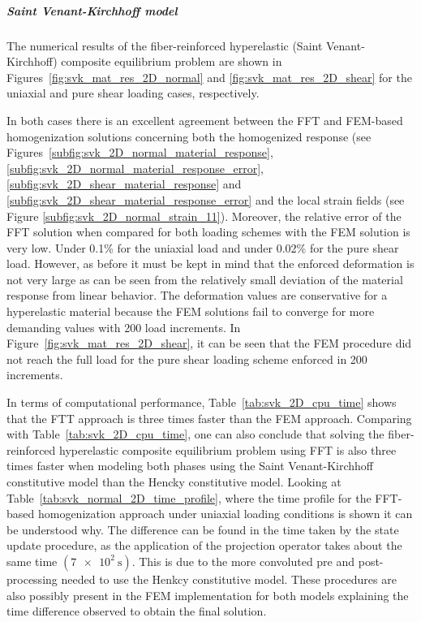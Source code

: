 
%

\FloatBarrier

\subparagraph{Saint Venant-Kirchhoff model}
\label{sec:svk_accuracy_validation}

The numerical results of the fiber-reinforced hyperelastic (Saint Venant-Kirchhoff) composite equilibrium problem are shown in Figures~\ref{fig:svk_mat_res_2D_normal} and \ref{fig:svk_mat_res_2D_shear} for the uniaxial and pure shear loading cases, respectively.

In both cases there is an excellent agreement between the FFT and FEM-based homogenization solutions concerning both the homogenized response (see Figures~\ref{subfig:svk_2D_normal_material_response}, \ref{subfig:svk_2D_normal_material_response_error}, \ref{subfig:svk_2D_shear_material_response} and \ref{subfig:svk_2D_shear_material_response_error} and the local strain fields (see Figure \ref{subfig:svk_2D_normal_strain_11}).
Moreover, the relative error of the FFT solution when compared for both loading schemes with the FEM solution is very low.
Under 0.1\% for the uniaxial load and under 0.02\% for the pure shear load.
However, as before it must be kept in mind that the enforced deformation is not very large as can be seen from the relatively small deviation of the material response from linear behavior.
The deformation values are conservative for a hyperelastic material because the FEM solutions fail to converge for more demanding values with 200 load increments.
In Figure~\ref{fig:svk_mat_res_2D_shear}, it can be seen that the FEM procedure did not reach the full load for the pure shear loading scheme enforced in 200 increments.

In terms of computational performance, Table~\ref{tab:svk_2D_cpu_time} shows that the FTT approach is three times faster than the FEM approach.
Comparing with Table~\ref{tab:svk_2D_cpu_time}, one can also conclude that solving the fiber-reinforced hyperelastic composite equilibrium problem using FFT is also three times faster when modeling both phases using the Saint Venant-Kirchhoff constitutive model than the Hencky constitutive model.
Looking at Table~\ref{tab:svk_normal_2D_time_profile}, where the time profile for the FFT-based homogenization approach under uniaxial loading conditions is shown it can be understood why.
The difference can be found in the time taken by the state update procedure, as the application of the projection operator takes about the same time \((\SI{7e2}{\second})\).
This is due to the more convoluted pre and post-processing needed to use the Henkcy constitutive model.
These procedures are also possibly present in the FEM implementation for both models explaining the time difference observed to obtain the final solution.

